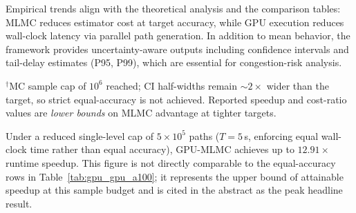 \documentclass{ieeeaccess}
\begin{document}
Empirical trends align with the theoretical analysis and the comparison tables: MLMC reduces
estimator cost at target accuracy, while GPU execution reduces wall-clock latency via parallel
path generation. In addition to mean behavior, the framework provides uncertainty-aware outputs
including confidence intervals and tail-delay estimates (P95, P99), which are essential for
congestion-risk analysis.

\begin{table}[t]
\caption{GPU Single-Level Monte Carlo vs GPU-MLMC (NVIDIA A100 80GB PCIe). Results are
single-run estimates; repeated-run error bars across five independent runs are shown in the figures below.}
\label{tab:gpu_gpu_a100}
\centering
{}
\vspace{2pt}
\footnotesize$^\dagger$MC sample cap of $10^6$ reached; CI half-widths remain ${\sim}2\times$
wider than the target, so strict equal-accuracy is not achieved. Reported speedup and cost-ratio
values are \emph{lower bounds} on MLMC advantage at tighter targets.\normalsize
\end{table}

Under a reduced single-level cap of $5\times10^5$ paths ($T{=}5$\,s, enforcing equal wall-clock
time rather than equal accuracy), GPU-MLMC achieves up to $12.91\times$ runtime speedup.
This figure is not directly comparable to the equal-accuracy rows in
Table~\ref{tab:gpu_gpu_a100}; it represents the upper bound of attainable speedup at this sample
budget and is cited in the abstract as the peak headline result.
\end{document}
